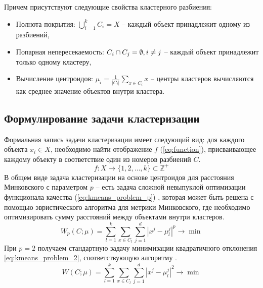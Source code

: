         Причем присутствуют следующие свойства кластерного разбиения:
        \begin{itemize}
            \item Полнота покрытия: \( \bigcup_{i=1}^{k} C_i = X \) -- каждый объект принадлежит одному из разбиений,
            \item Попарная непересекаемость: \( C_i \cap C_j = \emptyset, \space i \neq j\) -- каждый объект принадлежит только одному кластеру,
            \item Вычисление центроидов: \( \mu_i = \frac{1}{|C_i|} \sum_{x \in C_i} x\) -- центры кластеров вычисляются как среднее значение объектов внутри кластера.
        \end{itemize}

    \subsection{Формулирование задачи кластеризации}
        Формальная запись задачи кластеризации имеет следующий вид: для каждого объекта \(x_i \in X\), необходимо найти отображение \(f\) (\ref{eq:function}), присваивающее каждому объекту в соответствие один из номеров разбиений \(C\).
        \begin{equation}\label{eq:function}
            f: X \to \{1, 2, \dots, k\} \subset \mathbb{Z}^+
        \end{equation}
        В общем виде задача кластеризации на основе центроидов для расстояния Минковского с параметром \(p\) -- есть задача сложной невыпуклой оптимизации функционала качества (\ref{eq:kmeans_problem_p}) \cite{hse:4_course}, которая может быть решена с помощью эвристического алгоритма \kmeans{} для метрики Минковского, где необходимо оптимизировать сумму расстояний между объектами внутри кластеров.
        \begin{equation}\label{eq:kmeans_problem_p}
            W_p(C;\mu) = \sum_{l=1}^k \sum_{x \in C_l} \sum_{j=1}^{d} |x^j - \mu_l^j|^p \to \min
        \end{equation}
        При \(p=2\) получаем стандартную задачу минимизации квадратичного отклонения \ref{eq:kmeans_problem_2}, соответствующую алгоритму \kmeans{}.
        \begin{equation}\label{eq:kmeans_problem_2}
            W(C;\mu) = \sum_{l=1}^k \sum_{x \in C_l} \sum_{j=1}^{d} |x^j - \mu_l^j|^2 \to \min
        \end{equation}


